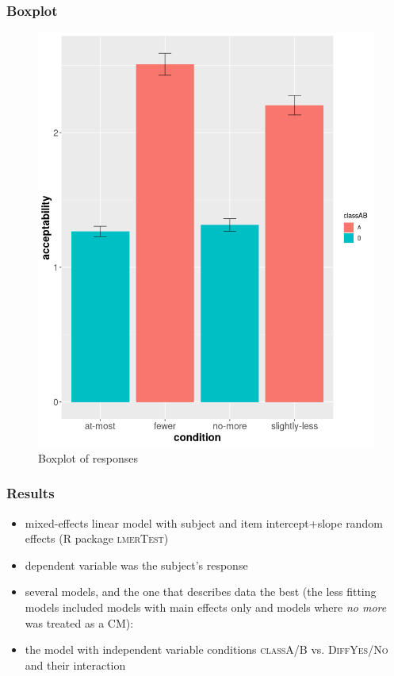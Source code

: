 \documentclass[10pt
]{beamer}
\newcommand{\cond}[1]{\textsc{#1}}
\begin{document}
\begin{frame}
  \frametitle{Boxplot}

\begin{figure}[htbp]
  \centering
  \includegraphics[scale=0.3]{plot_zoom_png.png}
  \caption{Boxplot of responses}
  \label{fig:boxplot}
\end{figure}
  

\end{frame}


\begin{frame}
  \frametitle{Results}

\begin{itemize}
  \item mixed-effects linear model with subject and item intercept+slope random effects (R package \textsc{lmerTest})
  \item dependent variable was the subject's response
  \item several models, and the one that describes data the best (the less fitting models included models with main effects only and models where \textit{no more} was treated as a CM):
  \item the model with independent variable conditions \cond{classA/B} vs. \cond{DiffYes/No} and their interaction
\end{itemize}

\end{frame}
\end{document}
